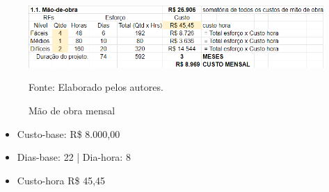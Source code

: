 \documentclass[
    12pt,               %
    openright,          %
    oneside,
    a4paper,            %
    BIBLATEX,           %
    TODO,               %
    english,            %
    brazil              %
    ]{ifsp-spo-inf-ctds}
\begin{document}
            \begin{figure}[H]
                \centering
                \caption{Mão de obra mensal}
                \includegraphics[width=1\textwidth]{images/Mao-de-obra.png}
                
                \label{fig:maodeobra}
                \centering
                \footnotesize Fonte: Elaborado pelos autores.
            \end{figure}
   \begin{itemize}
      \item Custo-base: R\$ 8.000,00 
        \item Dias-base: 22 | Dia-hora: 8
         \item Custo-hora R\$ 45,45
   \end{itemize} 
             
           

        

                
\end{document}
